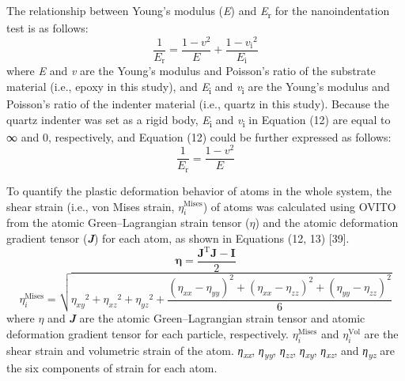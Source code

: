 \documentclass{article}
\begin{document}
The relationship between Young’s modulus (\emph{E}) and \emph{E}\textsubscript{r} for the nanoindentation test is as follows:
\begin{equation}
\frac{1}{E_{\mathrm{r}}} = \frac{1-v^2}{E} + \frac{1-{v_{\mathrm{i}}}^2}{E_{\mathrm{i}}} \tag{12}
\end{equation}
where \emph{E} and \emph{v} are the Young’s modulus and Poisson’s ratio of the substrate material (i.e., epoxy in this study), and \emph{E}\textsubscript{i} and \emph{v}\textsubscript{i} are the Young’s modulus and Poisson’s ratio of the indenter material (i.e., quartz in this study). Because the quartz indenter was set as a rigid body, \emph{E}\textsubscript{i} and \emph{v}\textsubscript{i} in Equation (12) are equal to ∞ and 0, respectively, and Equation (12) could be further expressed as follows:
\begin{equation}
\frac{1}{E_{\mathrm{r}}} = \frac{1-v^2}{E} \tag{13}
\end{equation}

To quantify the plastic deformation behavior of atoms in the whole system, the shear strain (i.e., von Mises strain, $\eta_i^{\mathrm{Mises}}$) of atoms was calculated using OVITO from the atomic Green–Lagrangian strain tensor (\boldmath$\eta$\unboldmath) and the atomic deformation gradient tensor (\textbf{\emph{J}}) for each atom, as shown in Equations (12, 13) [39].
\begin{equation}
\boldsymbol{\eta} = \frac{\boldsymbol{J}^{\mathrm{T}}\boldsymbol{J} - \boldsymbol{I}}{2} \tag{14}
\end{equation}
\begin{equation}
\eta_i^{\mathrm{Mises}} = \sqrt{{\eta_{xy}}^2 + {\eta_{xz}}^2 + {\eta_{yz}}^2 + \frac{\left(\eta_{xx} - \eta_{yy}\right)^2 + \left(\eta_{xx} - \eta_{zz}\right)^2 + \left(\eta_{yy} - \eta_{zz}\right)^2}{6}} \tag{15}
\end{equation}
where \boldmath$\eta$\unboldmath{} and \textbf{\emph{J}} are the atomic Green–Lagrangian strain tensor and atomic deformation gradient tensor for each particle, respectively. $\eta_i^{\mathrm{Mises}}$ and $\eta_i^{\mathrm{Vol}}$ are the shear strain and volumetric strain of the atom. \emph{η}\textsubscript{\emph{xx}}, \emph{η}\textsubscript{\emph{yy}}, \emph{η}\textsubscript{\emph{zz}}, \emph{η}\textsubscript{\emph{xy}}, \emph{η}\textsubscript{\emph{xz}}, and \emph{η}\textsubscript{\emph{yz}} are the six components of strain for each atom.
\end{document}

